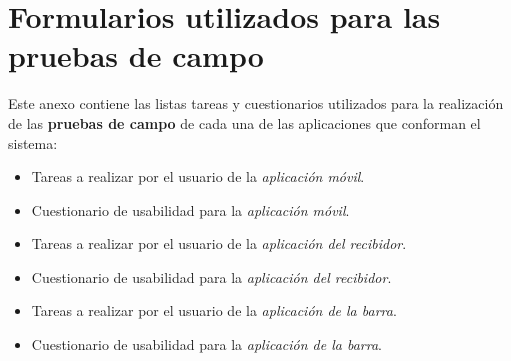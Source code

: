 \chapter{Formularios utilizados para las pruebas de campo}
\label{chap:test}

Este anexo contiene las listas tareas y cuestionarios utilizados para la
realización de las \textbf{pruebas de campo} de cada una de las aplicaciones
que conforman el sistema:
\begin{itemize}
\item Tareas a realizar por el usuario de la \emph{aplicación móvil}.
\item Cuestionario de usabilidad para la \emph{aplicación móvil}.
\item Tareas a realizar por el usuario de la \emph{aplicación del recibidor}.
\item Cuestionario de usabilidad para la \emph{aplicación del recibidor}.
\item Tareas a realizar por el usuario de la \emph{aplicación de la barra}.
\item Cuestionario de usabilidad para la \emph{aplicación de la barra}.
\end{itemize}













